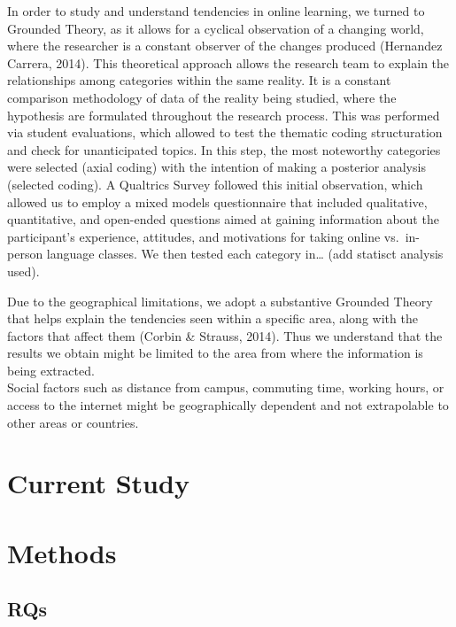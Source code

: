 \documentclass[
  man]{apa6}
\begin{document}
In order to study and understand tendencies in online learning, we turned to Grounded Theory, as it allows for a cyclical observation of a changing world, where the researcher is a constant observer of the changes produced (Hernandez Carrera, 2014).
This theoretical approach allows the research team to explain the relationships among categories within the same reality.
It is a constant comparison methodology of data of the reality being studied, where the hypothesis are formulated throughout the research process.
This was performed via student evaluations, which allowed to test the thematic coding structuration and check for unanticipated topics.
In this step, the most noteworthy categories were selected (axial coding) with the intention of making a posterior analysis (selected coding).
A Qualtrics Survey followed this initial observation, which allowed us to employ a mixed models questionnaire that included qualitative, quantitative, and open-ended questions aimed at gaining information about the participant's experience, attitudes, and motivations for taking online vs.~in-person language classes.
We then tested each category in\ldots{} (add statisct analysis used).

Due to the geographical limitations, we adopt a substantive Grounded Theory that helps explain the tendencies seen within a specific area, along with the factors that affect them (Corbin \& Strauss, 2014).
Thus we understand that the results we obtain might be limited to the area from where the information is being extracted.\\
Social factors such as distance from campus, commuting time, working hours, or access to the internet might be geographically dependent and not extrapolable to other areas or countries.

\hypertarget{current-study}{%
\section{Current Study}\label{current-study}}

\hypertarget{methods}{%
\section{Methods}\label{methods}}

\hypertarget{rqs}{%
\subsection{RQs}\label{rqs}}
\end{document}
